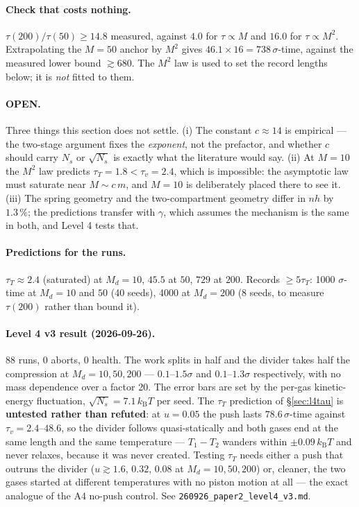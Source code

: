 \documentclass[11pt,a4paper]{article}
\newcommand{\kT}{k_{\mathrm B}T}
\begin{document}
\paragraph{Check that costs nothing.} $\tau(200)/\tau(50) \ge 14.8$ measured, against $4.0$ for
$\tau \propto M$ and $16.0$ for $\tau \propto M^2$. Extrapolating the $M = 50$ anchor by $M^2$ gives
$46.1 \times 16 = 738\,\sigma$-time, against the measured lower bound $\gtrsim 680$. The $M^2$ law
is used to set the record lengths below; it is \emph{not} fitted to them.

\paragraph{OPEN.} Three things this section does not settle. (i) The constant $c \approx 14$ is
empirical --- the two-stage argument fixes the \emph{exponent}, not the prefactor, and whether $c$
should carry $N_s$ or $\sqrt{N_s}$ is exactly what the literature would say. (ii) At $M = 10$ the
$M^2$ law predicts $\tau_T = 1.8 < \tau_v = 2.4$, which is impossible: the asymptotic law must
saturate near $M \sim c\,m$, and $M = 10$ is deliberately placed there to see it. (iii) The spring
geometry and the two-compartment geometry differ in $nh$ by $1.3\,\%$; the predictions transfer with
$\gamma$, which assumes the mechanism is the same in both, and Level 4 tests that.

\paragraph{Predictions for the runs.} $\tau_T \approx 2.4$ (saturated) at $M_d = 10$, $45.5$ at
$50$, $729$ at $200$. Records $\ge 5\tau_T$: 1000 $\sigma$-time at $M_d = 10$ and $50$ (40 seeds),
4000 at $M_d = 200$ (8 seeds, to measure $\tau(200)$ rather than bound it).

\paragraph{Level 4 v3 result (2026-09-26).} 88 runs, 0 aborts, 0 health. The work splits in half
and the divider takes half the compression at $M_d = 10, 50, 200$ --- $0.1$--$1.5\sigma$ and
$0.1$--$1.3\sigma$ respectively, with no mass dependence over a factor 20. The error bars are set by
the per-gas kinetic-energy fluctuation, $\sqrt{N_s} = 7.1\,\kT$ per seed. The $\tau_T$ prediction of
\S\ref{sec:l4tau} is \textbf{untested rather than refuted}: at $u = 0.05$ the push lasts
$78.6\,\sigma$-time against $\tau_v = 2.4$--$48.6$, so the divider follows quasi-statically and both
gases end at the same length and the same temperature --- $T_1 - T_2$ wanders within
$\pm 0.09\,\kT$ and never relaxes, because it was never created. Testing $\tau_T$ needs either a
push that outruns the divider ($u \gtrsim 1.6$, $0.32$, $0.08$ at $M_d = 10, 50, 200$) or, cleaner,
the two gases started at different temperatures with no piston motion at all --- the exact analogue
of the A4 no-push control. See \texttt{260926\_paper2\_level4\_v3.md}.
\end{document}
